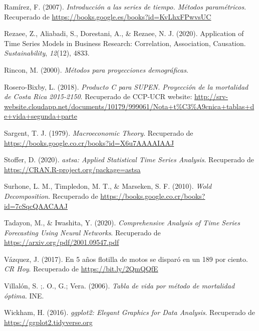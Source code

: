 \documentclass[
]{article}
\newlength{\cslhangindent}
\newlength{\cslentryspacingunit} %
\newenvironment{CSLReferences}[2] %
 {%
  \setlength{\parindent}{0pt}
  \ifodd #1
  \let\oldpar\par
  \def\par{\hangindent=\cslhangindent\oldpar}
  \fi
  \setlength{\parskip}{#2\cslentryspacingunit}
 }%
 {}
\begin{document}
\begin{CSLReferences}{1}{0}
\leavevmode{}%
Ramírez, F. (2007). \emph{Introducción a las series de tiempo. Métodos
paramétricos}. Recuperado de
\url{https://books.google.es/books?id=KvLhxFPwvsUC}

\leavevmode{}%
Rezaee, Z., Aliabadi, S., Dorestani, A., \& Rezaee, N. J. (2020).
Application of Time Series Models in Business Research: Correlation,
Association, Causation. \emph{Sustainability}, \emph{12}(12), 4833.

\leavevmode{}%
Rincon, M. (2000). \emph{Métodos para proyecciones demográficas}.

\leavevmode{}%
Rosero-Bixby, L. (2018). \emph{Producto C para SUPEN. Proyección de la
mortalidad de Costa Rica 2015-2150}. Recuperado de CCP-UCR website:
\url{http://srv-website.cloudapp.net/documents/10179/999061/Nota+t\%C3\%A9cnica+tablas+de+vida+segunda+parte}

\leavevmode{}%
Sargent, T. J. (1979). \emph{Macroeconomic Theory}. Recuperado de
\url{https://books.google.co.cr/books?id=X6u7AAAAIAAJ}

\leavevmode{}%
Stoffer, D. (2020). \emph{astsa: Applied Statistical Time Series
Analysis}. Recuperado de \url{https://CRAN.R-project.org/package=astsa}

\leavevmode{}%
Surhone, L. M., Timpledon, M. T., \& Marseken, S. F. (2010). \emph{Wold
Decomposition}. Recuperado de
\url{https://books.google.co.cr/books?id=7cSqcQAACAAJ}

\leavevmode{}%
Tadayon, M., \& Iwashita, Y. (2020). \emph{Comprehensive Analysis of
Time Series Forecasting Using Neural Networks}. Recuperado de
\url{https://arxiv.org/pdf/2001.09547.pdf}

\leavevmode{}%
Vázquez, J. (2017). En 5 años flotilla de motos se disparó en un 189 por
ciento. \emph{CR Hoy}. Recuperado de \url{https://bit.ly/2QmQQfE}

\leavevmode{}%
Villalón, S. ;. O., G.; Vera. (2006). \emph{Tabla de vida por método de
mortalidad óptima}. INE.

\leavevmode{}%
Wickham, H. (2016). \emph{ggplot2: Elegant Graphics for Data Analysis}.
Recuperado de \url{https://ggplot2.tidyverse.org}


\end{CSLReferences}
\end{document}
